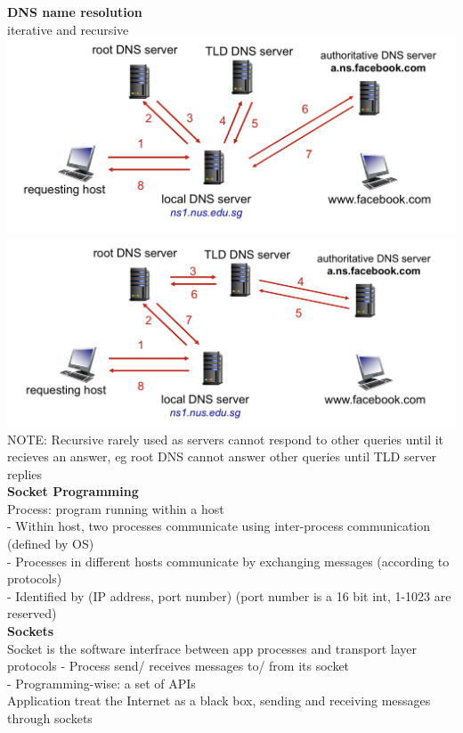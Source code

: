 \documentclass[10pt, a4paper]{article}
\newcommand{\red}[1]{{\color{red}#1}}
\begin{document}
\begin{multicols*}{3}
		\textbf{DNS name resolution}\\
		iterative and recursive\\
		\includegraphics[scale=.12]{./assets/iterativeDns}\\
		\includegraphics[scale=.12]{./assets/recursiveDns}\\
		\red{NOTE}: Recursive rarely used as servers cannot respond to other queries until it recieves an answer, eg root DNS cannot answer other queries until TLD server replies\\

		\textbf{Socket Programming}\\
		Process: program running within a host\\
		- Within host, two processes communicate using \red{inter-process communication (defined by OS)}\\
		- Processes in different hosts communicate by \red{exchanging messages (according to protocols)}\\
		- Identified by \red{(IP address, port number)} (port number is a 16 bit int, 1-1023 are reserved)\\

		\textbf{Sockets}\\
		Socket is the software interfrace between app processes and transport layer protocols
		- Process send/ receives messages to/ from its \red{socket}\\
		- Programming-wise: a set of APIs\\
		Application treat the Internet as a black box, sending and receiving messages through sockets\\


\end{multicols*}
\end{document}
